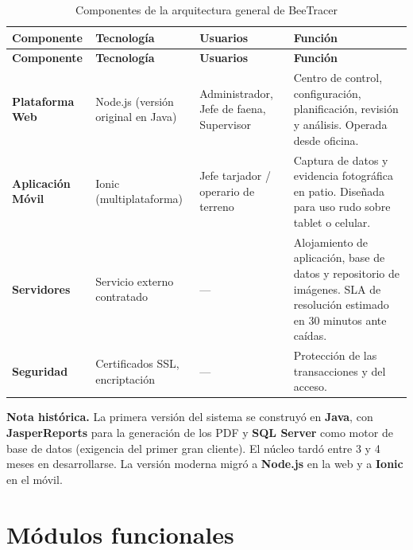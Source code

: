 {\estilotabla
\begin{longtable}{L{0.17\textwidth} L{0.20\textwidth} L{0.21\textwidth} L{0.33\textwidth}}

\caption{Componentes de la arquitectura general de BeeTracer}
\label{tab:arquitectura}
\\

\toprule
\textbf{Componente} & \textbf{Tecnología} & \textbf{Usuarios} & \textbf{Función} \\
\midrule
\endfirsthead

\toprule
\textbf{Componente} & \textbf{Tecnología} & \textbf{Usuarios} & \textbf{Función} \\
\midrule
\endhead

\textbf{Plataforma Web} &
Node.js (versión original en Java) &
Administrador, Jefe de faena, Supervisor &
Centro de control, configuración, planificación, revisión y análisis. Operada desde oficina. \\

\midrule

\textbf{Aplicación Móvil} &
Ionic (multiplataforma) &
Jefe tarjador / operario de terreno &
Captura de datos y evidencia fotográfica en patio. Diseñada para uso rudo sobre tablet o
celular. \\

\midrule

\textbf{Servidores} &
Servicio externo contratado &
--- &
Alojamiento de aplicación, base de datos y repositorio de imágenes. SLA de resolución estimado en
30 minutos ante caídas. \\

\midrule

\textbf{Seguridad} &
Certificados SSL, encriptación &
--- &
Protección de las transacciones y del acceso. \\

\bottomrule

\end{longtable}
}

\begin{nota}
\textbf{Nota histórica.} La primera versión del sistema se construyó en \textbf{Java}, con
\textbf{JasperReports} para la generación de los PDF y \textbf{SQL Server} como motor de base de
datos (exigencia del primer gran cliente). El núcleo tardó entre 3 y 4 meses en desarrollarse. La
versión moderna migró a \textbf{Node.js} en la web y a \textbf{Ionic} en el móvil.
\end{nota}

\section{Módulos funcionales}
\label{sec:modulos}

